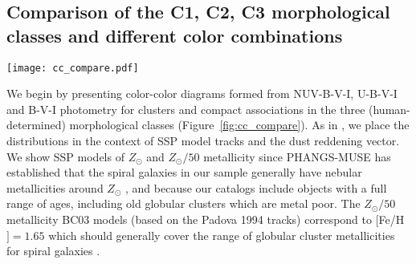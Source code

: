 \documentclass[linenumbers]{aastex63}
\begin{document}
{\subsection{Comparison of the C1, C2, C3 morphological classes and different color combinations}\label{ssect:cc_overview}
%
\begin{figure*} 
\texttt{[image: cc\_compare.pdf]}
 \caption{Color-color diagrams for the PHANGS-HST human classified sample, with each morphological class shown separately: C1 single-peaked symmetric clusters (left column); C2 single-peaked asymmetric clusters (middle column); and C3 multi-peaked compact associations (right column). In all panels V-I is plotted along the horizontal axis, and three other colors are shown along the vertical axis: NUV-B (top row), U-B (middle row) and B-V (bottom row).  We only show data points for clusters which are detected with at least a ${\rm S/N > 3}$ in the plotted bands. 
 Individual clusters are represented by black dots whereas in crowded regions we show a Gaussian-smoothed heat map indicating the relative density. 
 The size of the smoothing kernel is shown by a red circle on the top middle panel.
 A cyan track denotes the  SSP model for ${\rm Z_{\odot}}$ metallicity at ages from 1\,Myr till 13.7\,Gyr. The portion of the SSP track ${\rm Z_{\odot}/50}$ metallicity from 0.5-13.7\,Gyr is also shown with a magenta track. Key ages are indicated on the right column and are marked with blue and pink dots on each track.  A reddening vector (top right of each panel) corresponds to ${\rm A_v = 1.0 mag}$. In panel d), we indicate names for relevant loci in the color-color space.}
 \label{fig:cc_compare}
\end{figure*}
%
We begin by presenting color-color diagrams formed from NUV-B-V-I, U-B-V-I and B-V-I photometry for clusters and compact associations in the three (human-determined) morphological classes (Figure~\ref{fig:cc_compare}).  As in \citet{lee23ubvi}, we place the distributions in the context of   SSP model tracks and the dust reddening vector.  We show  SSP models of $Z_{\odot}$ and $Z_{\odot}/50$ metallicity since PHANGS-MUSE has established that the spiral galaxies in our sample generally have nebular metallicities around $Z_{\odot}$ \citep{kreckel_mapping_2019, groves_phangs-muse_2023, scheuermann_stellar_2023}, and because our catalogs include objects with a full range of ages, including old globular clusters which are metal poor. The $Z_{\odot}/50$ metallicity BC03 models (based on the Padova 1994 tracks) correspond to $[$Fe/H$]=1.65$ which should generally cover the range of globular cluster metallicities for spiral galaxies \citep[]{BS06}. 

}
\end{document}
